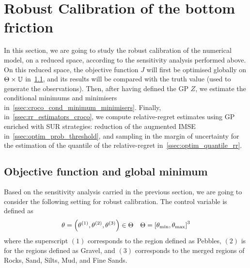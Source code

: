 \documentclass[../../Main_ManuscritThese.tex]{subfiles}
\newcommand{\zob}{z_b}
\begin{document}
\section{Robust Calibration of the bottom friction}
\label{sec:robust_calibration}
In this section, we are going to study the robust calibration of the
numerical model, on a reduced space, according to the sensitivity
analysis performed above.  On this reduced space, the objective
function $J$ will first be optimised globally on
$\Theta \times \mathbb{U}$ in~\cref{ssec:glob_mini}, and its results
will be compared with the truth value (used to generate the
observations). Then, after having defined the GP $Z$, we estimate the
conditional minimums and minimisers
in~\cref{ssec:croco_cond_minimum_minimisers}. Finally,
in~\cref{ssec:rr_estimators_croco}, we compute relative-regret
estimates using GP enriched with SUR strategies: reduction of the
augmented IMSE in~\cref{ssec:optim_prob_threshold}, and sampling in
the margin of uncertainty for the estimation of the quantile of the
relative-regret in~\cref{ssec:optim_quantile_rr}.

\subsection{Objective function and global minimum}
\label{ssec:glob_mini}
Based on the sensitivity analysis carried in the previous section, we
are going to consider the following setting for robust calibration.
The control variable is defined as
\begin{equation}
  \kk=\left(\kk^{(1)},\kk^{(2)},\kk^{(3)}\right) \in \Kspace %
  \quad \Kspace = \interval{\kk_{\min}}{\kk_{\max}}^3
\end{equation}
 where the superscript $(1)$ corresponds to the region
defined as Pebbles, $(2)$ is for the regions defined as Gravel, and
$(3)$ corresponds to the merged regions of Rocks, Sand, Silts, Mud,
and Fine Sands.

\end{document}

